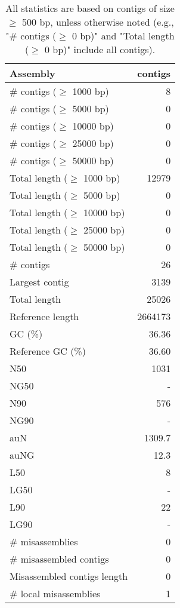 \documentclass[12pt,a4paper]{article}
\begin{document}
\begin{table}[ht]
\begin{center}
\caption{All statistics are based on contigs of size $\geq$ 500 bp, unless otherwise noted (e.g., "\# contigs ($\geq$ 0 bp)" and "Total length ($\geq$ 0 bp)" include all contigs).}
\begin{tabular}{|l*{1}{|r}|}
\hline
Assembly & contigs \\ \hline
\# contigs ($\geq$ 1000 bp) & 8 \\ \hline
\# contigs ($\geq$ 5000 bp) & 0 \\ \hline
\# contigs ($\geq$ 10000 bp) & 0 \\ \hline
\# contigs ($\geq$ 25000 bp) & 0 \\ \hline
\# contigs ($\geq$ 50000 bp) & 0 \\ \hline
Total length ($\geq$ 1000 bp) & 12979 \\ \hline
Total length ($\geq$ 5000 bp) & 0 \\ \hline
Total length ($\geq$ 10000 bp) & 0 \\ \hline
Total length ($\geq$ 25000 bp) & 0 \\ \hline
Total length ($\geq$ 50000 bp) & 0 \\ \hline
\# contigs & 26 \\ \hline
Largest contig & 3139 \\ \hline
Total length & 25026 \\ \hline
Reference length & 2664173 \\ \hline
GC (\%) & 36.36 \\ \hline
Reference GC (\%) & 36.60 \\ \hline
N50 & 1031 \\ \hline
NG50 & - \\ \hline
N90 & 576 \\ \hline
NG90 & - \\ \hline
auN & 1309.7 \\ \hline
auNG & 12.3 \\ \hline
L50 & 8 \\ \hline
LG50 & - \\ \hline
L90 & 22 \\ \hline
LG90 & - \\ \hline
\# misassemblies & 0 \\ \hline
\# misassembled contigs & 0 \\ \hline
Misassembled contigs length & 0 \\ \hline
\# local misassemblies & 1 \\ \hline

\end{tabular}
\end{center}
\end{table}
\end{document}
